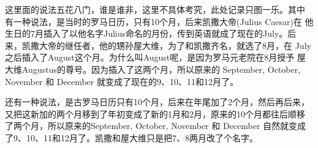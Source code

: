 这里面的说法五花八门，谁是谁非，这里不具体考究，此处记录只图一乐。其中
有一种说法，是当时的罗马日历，只有10个月，后来凯撒大帝(Julius Caesar)在
他生日的7月插入了以他名字Julius命名的月份，传到英语就成了现在的July。后
来，凯撒大帝的继任者，他的甥孙屋大维，为了和凯撒齐名，就选了8月，在
July之后插入了August这个月。为什么叫August呢，是因为罗马元老院在8月授予
屋大维Augustus的尊号。因为插入了这两个月，所以原来的 September,
October, November 和 December 就变成了现在的9、10、11和12月了。

还有一种说法，是古罗马日历只有10个月，后来在年尾加了2个月，然后再后来，
又把这新加的两个月移到了年初变成了新的1月和2月，原来的10个月都往后顺移
了两个月，所以原来的September, October, November 和 December 自然就变成
了9、10、11和12月了。凯撒和屋大维只是把7、8两月改了个名字。


